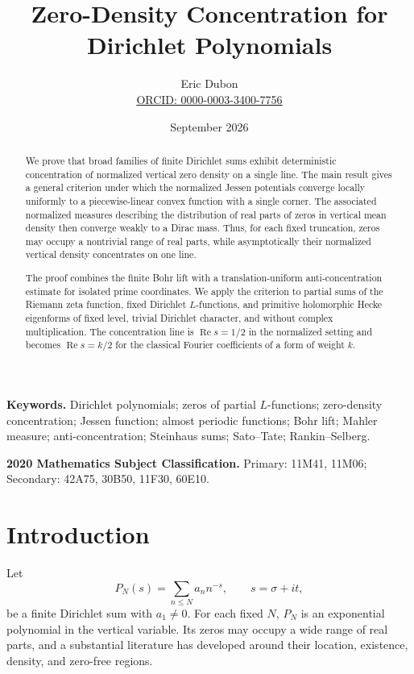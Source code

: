 \documentclass[11pt]{article}
\title{\textbf{Zero-Density Concentration for Dirichlet Polynomials}}
\author{
Eric Dubon\\[0.3em]
\href{https://orcid.org/0000-0003-3400-7756}
{ORCID: 0000-0003-3400-7756}
}
\date{September 2026}
\theoremstyle{definition}
\newcommand{\Ree}{\operatorname{Re}}
\newcommand{\1}{\mathbf 1}
\begin{document}
\maketitle

\begingroup
\renewcommand{\thefootnote}{}
\addtocounter{footnote}{-1}
\endgroup

\begin{abstract}
We prove that broad families of finite Dirichlet sums exhibit deterministic concentration of normalized vertical zero density on a single line.  The main result gives a general criterion under which the normalized Jessen potentials converge locally uniformly to a piecewise-linear convex function with a single corner.  The associated normalized measures describing the distribution of real parts of zeros in vertical mean density then converge weakly to a Dirac mass.  Thus, for each fixed truncation, zeros may occupy a nontrivial range of real parts, while asymptotically their normalized vertical density concentrates on one line.

The proof combines the finite Bohr lift with a translation-uniform anti-concentration estimate for isolated prime coordinates.  We apply the criterion to partial sums of the Riemann zeta function, fixed Dirichlet $L$-functions, and primitive holomorphic Hecke eigenforms of fixed level, trivial Dirichlet character, and without complex multiplication.  The concentration line is $\Ree s=1/2$ in the normalized setting and becomes $\Ree s=k/2$ for the classical Fourier coefficients of a form of weight $k$.
\end{abstract}

\medskip
\noindent\textbf{Keywords.} Dirichlet polynomials; zeros of partial $L$-functions; zero-density concentration; Jessen function; almost periodic functions; Bohr lift; Mahler measure; anti-concentration; Steinhaus sums; Sato--Tate; Rankin--Selberg.

\smallskip
\noindent\textbf{2020 Mathematics Subject Classification.} Primary: 11M41, 11M06; Secondary: 42A75, 30B50, 11F30, 60E10.

\section{Introduction}

Let
\begin{equation}\label{eq:intro-P}
P_N(s)=\sum_{n\le N}a_n n^{-s},\qquad s=\sigma+it,
\end{equation}
be a finite Dirichlet sum with $a_1\neq0$.  For each fixed $N$, $P_N$ is an exponential polynomial in the vertical variable.  Its zeros may occupy a wide range of real parts, and a substantial literature has developed around their location, existence, density, and zero-free regions.
\end{document}
